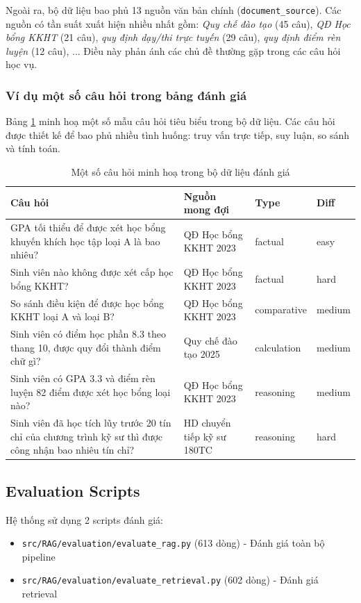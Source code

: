 \documentclass[../DoAn.tex]{subfiles}
\begin{document}
Ngoài ra, bộ dữ liệu bao phủ 13 nguồn văn bản chính (\texttt{document\_source}). Các nguồn có tần suất xuất hiện nhiều nhất gồm: \textit{Quy chế đào tạo} (45 câu), \textit{QĐ Học bổng KKHT} (21 câu), \textit{quy định dạy/thi trực tuyến} (29 câu), \textit{quy định điểm rèn luyện} (12 câu), ... Điều này phản ánh các chủ đề thường gặp trong các câu hỏi học vụ.

\subsubsection{Ví dụ một số câu hỏi trong bảng đánh giá}

Bảng \ref{tab:eval-sample-questions} minh hoạ một số mẫu câu hỏi tiêu biểu trong bộ dữ liệu. Các câu hỏi được thiết kế để bao phủ nhiều tình huống: truy vấn trực tiếp, suy luận, so sánh và tính toán.

\begin{table}[h]
\centering
\begin{tabular}{|p{7.4cm}|p{4.6cm}|p{1.6cm}|p{1.6cm}|}
\hline
\textbf{Câu hỏi} & \textbf{Nguồn mong đợi} & \textbf{Type} & \textbf{Diff} \\
\hline
GPA tối thiểu để được xét học bổng khuyến khích học tập loại A là bao nhiêu? & QĐ Học bổng KKHT 2023 & factual & easy \\
\hline
Sinh viên nào không được xét cấp học bổng KKHT? & QĐ Học bổng KKHT 2023 & factual & hard \\
\hline
So sánh điều kiện để được học bổng KKHT loại A và loại B? & QĐ Học bổng KKHT 2023 & comparative & medium \\
\hline
Sinh viên có điểm học phần 8.3 theo thang 10, được quy đổi thành điểm chữ gì? & Quy chế đào tạo 2025 & calculation & medium \\
\hline
Sinh viên có GPA 3.3 và điểm rèn luyện 82 điểm được xét học bổng loại nào? & QĐ Học bổng KKHT 2023 & reasoning & medium \\
\hline
Sinh viên đã học tích lũy trước 20 tín chỉ của chương trình kỹ sư thì được công nhận bao nhiêu tín chỉ? & HD chuyển tiếp kỹ sư 180TC & reasoning & hard \\
\hline
\end{tabular}
\caption{Một số câu hỏi minh hoạ trong bộ dữ liệu đánh giá}
\label{tab:eval-sample-questions}
\end{table}

\subsection{Evaluation Scripts}
Hệ thống sử dụng 2 scripts đánh giá:
\begin{itemize}
    \item \texttt{src/RAG/evaluation/evaluate\_rag.py} (613 dòng) - Đánh giá toàn bộ pipeline
    \item \texttt{src/RAG/evaluation/evaluate\_retrieval.py} (602 dòng) - Đánh giá retrieval
\end{itemize}
\end{document}
